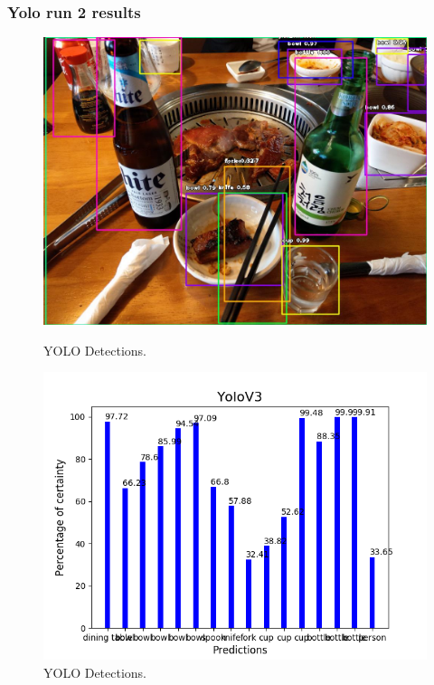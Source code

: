     \newpage

    \subsubsection{Yolo run 2 results}

    \begin{figure}[htb]
        \centering
        \begin{minipage}[b]{0.44\textwidth}
          \includegraphics[width=\textwidth]{Sections/4InitialWork/4_images_obj_run2/yolo.jpg}
          \caption{YOLO Detections.}
        \end{minipage}
        \hfill
        \begin{minipage}[b]{0.50\textwidth}
          \includegraphics[width=\textwidth]{Sections/4InitialWork/4_images_obj_run2/yolo_graph.png}
          \caption{YOLO Detections.}
        \end{minipage}
      \end{figure}
    
